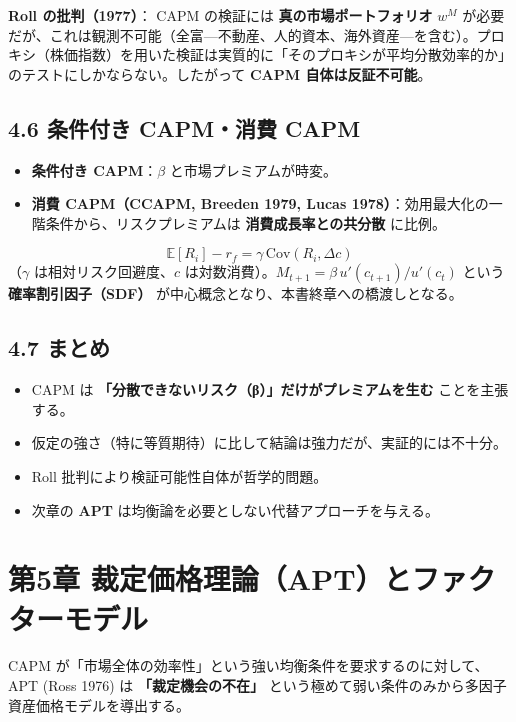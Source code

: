 \documentclass[11pt,a4paper]{report}
\begin{document}
\textbf{Roll の批判（1977）}： CAPM の検証には \textbf{真の市場ポートフォリオ} $w^M$ が必要だが、これは観測不可能（全富—不動産、人的資本、海外資産—を含む）。プロキシ（株価指数）を用いた検証は実質的に「そのプロキシが平均分散効率的か」のテストにしかならない。したがって \textbf{CAPM 自体は反証不可能}。

\section{4.6 条件付き CAPM・消費 CAPM}

\begin{itemize}
\item \textbf{条件付き CAPM}：$\beta$ と市場プレミアムが時変。
\item \textbf{消費 CAPM（CCAPM, Breeden 1979, Lucas 1978）}：効用最大化の一階条件から、リスクプレミアムは \textbf{消費成長率との共分散} に比例。
\end{itemize}
\[ \mathbb{E}[R_i] - r_f = \gamma\, \mathrm{Cov}(R_i, \Delta c) \] （$\gamma$ は相対リスク回避度、$c$ は対数消費）。$M_{t+1} = \beta\, u'(c_{t+1})/u'(c_t)$ という \textbf{確率割引因子（SDF）} が中心概念となり、本書終章への橋渡しとなる。

\section{4.7 まとめ}

\begin{itemize}
\item CAPM は \textbf{「分散できないリスク（β）」だけがプレミアムを生む} ことを主張する。
\item 仮定の強さ（特に等質期待）に比して結論は強力だが、実証的には不十分。
\item Roll 批判により検証可能性自体が哲学的問題。
\item 次章の \textbf{APT} は均衡論を必要としない代替アプローチを与える。
\end{itemize}

\noindent\hrulefill

\chapter{第5章 裁定価格理論（APT）とファクターモデル}

CAPM が「市場全体の効率性」という強い均衡条件を要求するのに対して、APT (Ross 1976) は \textbf{「裁定機会の不在」} という極めて弱い条件のみから多因子資産価格モデルを導出する。
\end{document}
